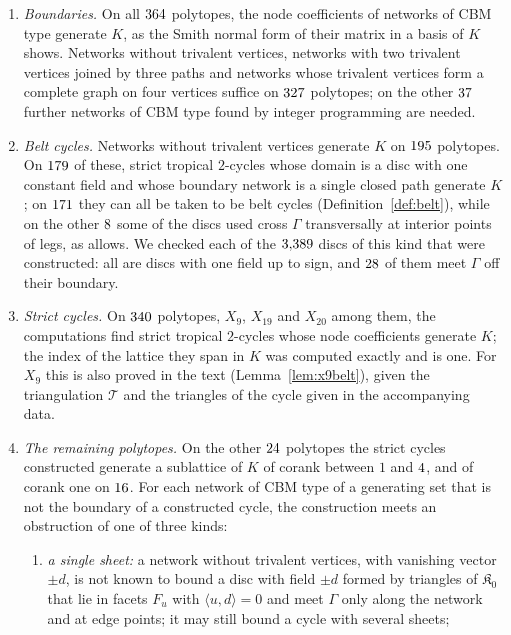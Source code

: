 \begin{enumerate}
\item[(a)] \emph{Boundaries.} On all $364$ polytopes, the node coefficients of networks of CBM type generate $K$, as
the Smith normal form of their matrix in a basis of $K$ shows. Networks without trivalent vertices, networks with two
trivalent vertices joined by three paths and networks whose trivalent vertices form a complete graph on four vertices
suffice on $327$ polytopes; on the other $37$ further networks of CBM type found by integer programming
are needed.
\item[(b)] \emph{Belt cycles.} Networks without trivalent vertices generate $K$ on $195$ polytopes. On
$179$ of these, strict tropical $2$-cycles whose domain is a disc with one constant field and whose boundary network is
a single closed path generate $K$; on $171$ they can all be taken to be belt cycles (Definition~\ref{def:belt}),
while on the other $8$ some of the discs used cross $\Gamma$ transversally at interior points of legs, as
\cite[Def.~7.2]{CBM} allows. We checked each of the $3{,}389$ discs of this kind that were constructed: all are
discs with one field up to sign, and $28$ of them meet $\Gamma$ off their boundary.
\item[(c)] \emph{Strict cycles.} On $340$ polytopes, $X_9$, $X_{19}$ and $X_{20}$ among them, the computations find
strict tropical $2$-cycles whose node coefficients generate $K$; the index of the lattice they span in $K$ was computed
exactly and is one. For $X_9$ this is also proved in the text (Lemma~\ref{lem:x9belt}), given the triangulation $\mathcal T$ and the
triangles of the cycle given in the accompanying data.
\item[(d)] \emph{The remaining polytopes.} On the other $24$ polytopes the strict cycles constructed generate a
sublattice of $K$ of corank between $1$ and $4$, and of corank one on $16$. For each network of CBM type
of a generating set that is not the boundary of a constructed cycle, the construction meets an obstruction of one of
three kinds:
\begin{enumerate}
\item[(1)] \emph{a single sheet:} a network without trivalent vertices, with vanishing vector $\pm d$, is not known to
bound a disc with field $\pm d$ formed by triangles of $\mathfrak K_0$ that lie in facets $F_u$ with $\langle u,d\rangle=0$
and meet $\Gamma$ only along the network and at edge points; it may still bound a cycle with several sheets;

\end{enumerate}
\end{enumerate}
